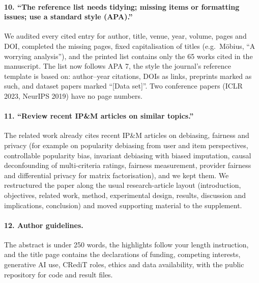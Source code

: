 \documentclass[11pt]{article}
\begin{document}
\paragraph{10. ``The reference list needs tidying; missing items or formatting issues; use a standard style (APA).''}
We audited every cited entry for author, title, venue, year, volume, pages and DOI, completed the missing
pages, fixed capitalisation of titles (e.g.\ M\"obius, ``A worrying analysis''), and the printed list contains only the 65 works cited in the
manuscript. The list now follows APA 7, the style the journal's reference template is based on:
author--year citations, DOIs as links, preprints marked as such, and dataset papers marked
``[Data set]''. Two conference papers (ICLR 2023, NeurIPS 2019) have no page numbers.

\paragraph{11. ``Review recent IP\&M articles on similar topics.''}
The related work already cites recent IP\&M articles on debiasing, fairness and privacy (for example on
popularity debiasing from user and item perspectives, controllable popularity bias, invariant debiasing with
biased imputation, causal deconfounding of multi-criteria ratings, fairness measurement, provider fairness and
differential privacy for matrix factorisation), and we kept them. We restructured the paper along the usual
research-article layout (introduction, objectives, related work, method, experimental design, results, discussion
and implications, conclusion) and moved supporting material to the supplement.

\paragraph{12. Author guidelines.}
The abstract is under 250 words, the highlights follow your length instruction, and the title page contains the
declarations of funding, competing interests, generative AI use, CRediT roles, ethics and data availability, with the
public repository for code and result files.
\end{document}
